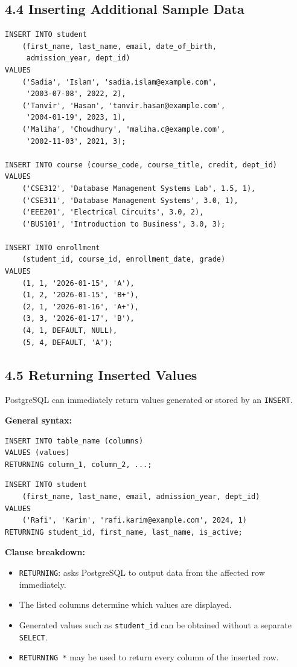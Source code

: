 \documentclass[12pt,a4paper]{article}
\begin{document}
\subsection*{4.4 Inserting Additional Sample Data}
\begin{verbatim}
INSERT INTO student
    (first_name, last_name, email, date_of_birth,
     admission_year, dept_id)
VALUES
    ('Sadia', 'Islam', 'sadia.islam@example.com',
     '2003-07-08', 2022, 2),
    ('Tanvir', 'Hasan', 'tanvir.hasan@example.com',
     '2004-01-19', 2023, 1),
    ('Maliha', 'Chowdhury', 'maliha.c@example.com',
     '2002-11-03', 2021, 3);

INSERT INTO course (course_code, course_title, credit, dept_id)
VALUES
    ('CSE312', 'Database Management Systems Lab', 1.5, 1),
    ('CSE311', 'Database Management Systems', 3.0, 1),
    ('EEE201', 'Electrical Circuits', 3.0, 2),
    ('BUS101', 'Introduction to Business', 3.0, 3);

INSERT INTO enrollment
    (student_id, course_id, enrollment_date, grade)
VALUES
    (1, 1, '2026-01-15', 'A'),
    (1, 2, '2026-01-15', 'B+'),
    (2, 1, '2026-01-16', 'A+'),
    (3, 3, '2026-01-17', 'B'),
    (4, 1, DEFAULT, NULL),
    (5, 4, DEFAULT, 'A');
\end{verbatim}

\subsection*{4.5 Returning Inserted Values}
PostgreSQL can immediately return values generated or stored by an \texttt{INSERT}.

\noindent\textbf{General syntax:}
\begin{verbatim}
INSERT INTO table_name (columns)
VALUES (values)
RETURNING column_1, column_2, ...;
\end{verbatim}

\begin{verbatim}
INSERT INTO student
    (first_name, last_name, email, admission_year, dept_id)
VALUES
    ('Rafi', 'Karim', 'rafi.karim@example.com', 2024, 1)
RETURNING student_id, first_name, last_name, is_active;
\end{verbatim}

\noindent\textbf{Clause breakdown:}
\begin{itemize}
    \item \texttt{RETURNING}: asks PostgreSQL to output data from the affected row immediately.
    \item The listed columns determine which values are displayed.
    \item Generated values such as \texttt{student\_id} can be obtained without a separate \texttt{SELECT}.
    \item \texttt{RETURNING *} may be used to return every column of the inserted row.
\end{itemize}
\end{document}
